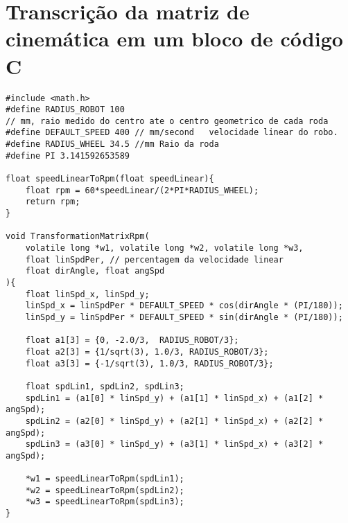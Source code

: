 

\chapter{Transcrição da matriz de cinemática em um bloco de código C \label{anx_matriz_cinematica_c}}

\lstset{language=C}
\begin{lstlisting}
#include <math.h>
#define RADIUS_ROBOT 100
// mm, raio medido do centro ate o centro geometrico de cada roda
#define DEFAULT_SPEED 400 // mm/second   velocidade linear do robo.
#define RADIUS_WHEEL 34.5 //mm Raio da roda
#define PI 3.141592653589

float speedLinearToRpm(float speedLinear){
    float rpm = 60*speedLinear/(2*PI*RADIUS_WHEEL);
    return rpm;
}

void TransformationMatrixRpm(
	volatile long *w1, volatile long *w2, volatile long *w3,
	float linSpdPer, // percentagem da velocidade linear
	float dirAngle, float angSpd
){
	float linSpd_x, linSpd_y;
	linSpd_x = linSpdPer * DEFAULT_SPEED * cos(dirAngle * (PI/180));
	linSpd_y = linSpdPer * DEFAULT_SPEED * sin(dirAngle * (PI/180));

	float a1[3] = {0, -2.0/3,  RADIUS_ROBOT/3};
	float a2[3] = {1/sqrt(3), 1.0/3, RADIUS_ROBOT/3};
	float a3[3] = {-1/sqrt(3), 1.0/3, RADIUS_ROBOT/3};

	float spdLin1, spdLin2, spdLin3;
	spdLin1 = (a1[0] * linSpd_y) + (a1[1] * linSpd_x) + (a1[2] * angSpd);
	spdLin2 = (a2[0] * linSpd_y) + (a2[1] * linSpd_x) + (a2[2] * angSpd);
	spdLin3 = (a3[0] * linSpd_y) + (a3[1] * linSpd_x) + (a3[2] * angSpd);
	
	*w1 = speedLinearToRpm(spdLin1);
	*w2 = speedLinearToRpm(spdLin2);
	*w3 = speedLinearToRpm(spdLin3);	
}
\end{lstlisting}